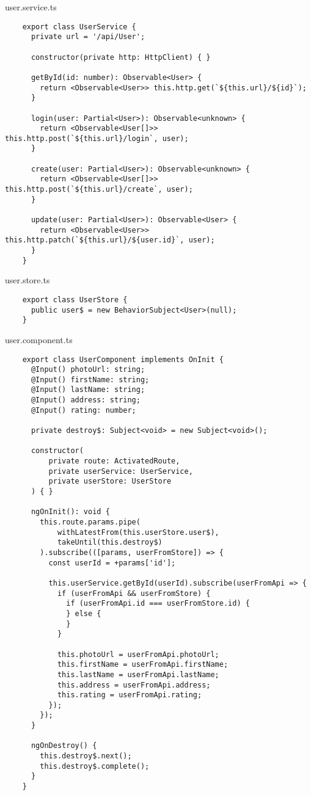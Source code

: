 user.service.ts
\begin{lstlisting}
    export class UserService {
      private url = '/api/User';
    
      constructor(private http: HttpClient) { }
    
      getById(id: number): Observable<User> {
        return <Observable<User>> this.http.get(`${this.url}/${id}`);
      }
    
      login(user: Partial<User>): Observable<unknown> {
        return <Observable<User[]>> this.http.post(`${this.url}/login`, user);
      }
    
      create(user: Partial<User>): Observable<unknown> {
        return <Observable<User[]>> this.http.post(`${this.url}/create`, user);
      }
    
      update(user: Partial<User>): Observable<User> {
        return <Observable<User>> this.http.patch(`${this.url}/${user.id}`, user);
      }
    }    
\end{lstlisting}

user.store.ts
\begin{lstlisting}
    export class UserStore {
      public user$ = new BehaviorSubject<User>(null);
    }    
\end{lstlisting}

user.component.ts
\begin{lstlisting}
    export class UserComponent implements OnInit {
      @Input() photoUrl: string;
      @Input() firstName: string;
      @Input() lastName: string;
      @Input() address: string;
      @Input() rating: number;
    
      private destroy$: Subject<void> = new Subject<void>();
    
      constructor(
          private route: ActivatedRoute,
          private userService: UserService,
          private userStore: UserStore
      ) { }
    
      ngOnInit(): void {
        this.route.params.pipe(
            withLatestFrom(this.userStore.user$),
            takeUntil(this.destroy$)
        ).subscribe(([params, userFromStore]) => {
          const userId = +params['id'];
    
          this.userService.getById(userId).subscribe(userFromApi => {
            if (userFromApi && userFromStore) {
              if (userFromApi.id === userFromStore.id) {
              } else {
              }
            }
    
            this.photoUrl = userFromApi.photoUrl;
            this.firstName = userFromApi.firstName;
            this.lastName = userFromApi.lastName;
            this.address = userFromApi.address;
            this.rating = userFromApi.rating;
          });
        });
      }
    
      ngOnDestroy() {
        this.destroy$.next();
        this.destroy$.complete();
      }
    }    
\end{lstlisting}

